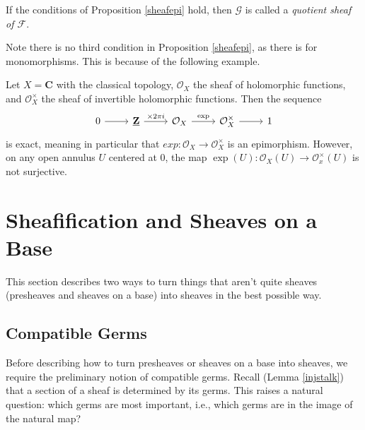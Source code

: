 \documentclass[11pt,openany]{book} %
\newcommand{\Z}{\mathbf{Z}}
\newcommand{\C}{\mathbf{C}}
\begin{document}
\begin{definition}
If the conditions of Proposition \ref{sheafepi} hold, then $\mathcal{G}$ is called a \emph{quotient sheaf of $\mathcal{F}$}.
\end{definition}

Note there is no third condition in Proposition \ref{sheafepi}, as there is for monomorphisms. This is because of the following example.

\begin{example}
Let $X = \C$ with the classical topology, $\mathcal{O}_X$ the sheaf of holomorphic functions, and $\mathcal{O}_X^{\times}$ the sheaf of invertible holomorphic functions. Then the sequence
\[
\begin{tikzcd}
0 \ar[r] & \underline{\Z} \ar[r, "\times 2 \pi i"] & \mathcal{O}_X \ar[r, "\operatorname{exp}"] & \mathcal{O}_X^{\times} \ar[r] & 1
\end{tikzcd}
\]
is exact, meaning in particular that $exp : \mathcal{O}_X \to \mathcal{O}_X^{\times}$ is an epimorphism. However, on any open annulus $U$ centered at $0$, the map $\operatorname{exp}(U) : \mathcal{O}_X(U) \to \mathcal{O}_x^{\times}(U)$ is not surjective.
\end{example}



\section{Sheafification and Sheaves on a Base}
This section describes two ways to turn things that aren't quite sheaves (presheaves and sheaves on a base) into sheaves in the best possible way.


\subsection{Compatible Germs}
Before describing how to turn presheaves or sheaves on a base into sheaves, we require the preliminary notion of compatible germs. Recall (Lemma \ref{injstalk}) that a section of a sheaf is determined by its germs. This raises a natural question: which germs are most important, i.e., which germs are in the image of the natural map?\\
\end{document}
